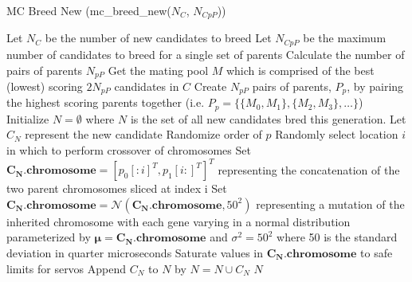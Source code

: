 \documentclass{article}
\begin{document}
\begin{algorithm}
	\caption{MC Breed New (mc\_breed\_new($N_C$, $N_{CpP}$))}
	\begin{algorithmic}[1]
		\State Let $N_C$ be the number of new candidates to breed
		\State Let $N_{CpP}$ be the maximum number of candidates to breed for a single set of parents
		\State Calculate the number of pairs of parents $N_{pP}$
		\State Get the mating pool $M$ which is comprised of the best (lowest) scoring $2N_{pP}$ candidates in $C$
		\State Create $N_{pP}$ pairs of parents, $P_p$, by pairing the highest scoring parents together (i.e. $P_p = \{\{M_0, M_1\}, \{M_2, M_3\}, \dots\}$)
		\State Initialize $N = \emptyset$ where $N$ is the set of all new candidates bred this generation.
				\State Let $C_N$ represent the new candidate 
				\State Randomize order of $p$
				\State Randomly select location $i$ in which to perform crossover of chromosomes
				\State Set $\mathbf{C_N.chromosome} = [p_0[:i]^T, p_1[i:]^T]^T$ representing the concatenation of the two parent chromosomes sliced at index i
				\State Set $\mathbf{C_N.chromosome} = \mathcal{N}(\mathbf{C_N.chromosome}, 50^2)$ representing a mutation of the inherited chromosome with each gene varying in a normal distribution parameterized by $\bm{\mu} = \mathbf{C_N.chromosome}$ and $\sigma^2 = 50^2$ where 50 is the standard deviation in quarter microseconds
				\State Saturate values in $\mathbf{C_N.chromosome}$ to safe limits for servos
				\State Append $C_N$ to $N$ by $N = N \cup C_N$
			\EndFor
		\EndFor
		\State \Return $N$
	\end{algorithmic} 
\end{algorithm} 
\end{document}
